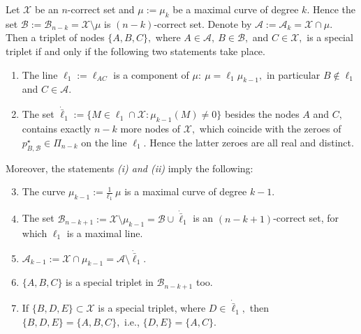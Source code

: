 \documentclass[10pt,a4paper]{amsart}
\newcommand{\Aset}{\mathcal{A}}
\newcommand{\Bset}{\mathcal{B}}
\newcommand{\Xset}{\mathcal{X}}
\begin{document}
\begin{theorem}\label{th1sptr}
Let $\Xset$ be an $n$-correct set and $\mu:=\mu_k$ be a maximal curve of degree $k.$ Hence the set $\Bset:=\Bset_{n-k}=\Xset\setminus \mu$ is $(n-k)$-correct set. Denote by $\Aset:=\Aset_{k}=\Xset\cap \mu.$\\ Then a triplet of nodes $\{A,B,C\},$ where $A \in \Aset,\ B\in \Bset,$ and $C \in \Xset,$ is a special triplet if and only if the following two statements take place.
\begin{enumerate}
\setlength{\itemsep}{0mm}
\item
The line $\ell_1:=\ell_{AC}$ is a component of $\mu:\ \mu=\ell_1\mu_{k-1},$ in particular $B\notin \ell_1$ and $C\in \Aset.$  
\item
The set $\dot{\bar \ell}_1:=\{M\in{\ell_1}\cap  \Xset: \mu_{k-1}(M)\neq 0\}$ besides the nodes $A$ and $C,$ contains exactly $n-k$ more nodes of $\Xset,$ which 
coincide with the zeroes of $p^\star_{B,\Bset}\in\Pi_{n-k}$ on the line $\ell_1.$ Hence the latter zeroes are all real and distinct.
\end{enumerate}
Moreover, the statements \emph{(i) and (ii)} imply the following:
\begin{enumerate}
\setcounter{enumi}{2}
\setlength{\itemsep}{0mm}
\item
The curve $\mu_{k-1}:=\frac{1}{\ell_1}\ \mu$ is a maximal curve of degree $k-1.$ 

\item
The set $\Bset_{n-k+1}:=\Xset\setminus\mu_{k-1}=\Bset\cup \dot{\bar \ell}_1$ is an  $(n-k+1)$-correct set, for which $\ell_1$ is a maximal line.  
\item
$\Aset_{k-1}:=\Xset\cap\mu_{k-1}=\Aset\setminus \dot{\bar \ell}_1.$
\item 
$\{A,B,C\}$ is a special triplet in $\Bset_{n-k+1}$ too.
 
\item
If $\{B,D,E\}\subset\Xset$  is a special triplet, where $D\in \dot{\bar \ell}_1,$ then $\{B,D,E\}=\{A,B,C\},$ i.e., $\{D,E\}=\{A,C\}.$
\end{enumerate}
\end{theorem}
\end{document}
